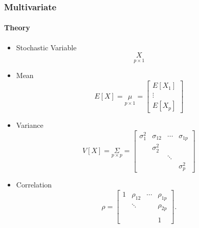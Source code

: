 \documentclass[aspectratio=169,10pt,t]{beamer}
\begin{document}
\begin{frame}[t]
    \frametitle{Multivariate}
    \framesubtitle{Theory}
    \begin{itemize}
        \item<only@1> Stochastic Variable
            \[
                \underset{p\times 1}{X}
            \] 
        \item Mean
            \[
                E \left[ X \right] =
                \underset{p\times 1}{\mu} =
                \begin{bmatrix}
                    E \left[ X_1  \right] \\
                    \vdots\\
                    E \left[ X_p  \right] 
                \end{bmatrix}
            \] 
        \item Variance
            \[
                V \left[ X  \right]  =
                \underset{p\times p}{\Sigma}
                =
                \begin{bmatrix}
                    \sigma_1^{2} & \sigma_{12} & \cdots & \sigma_{1p}\\
                                 & \sigma_2^{2} & &\\
                                 & & \ddots &\\
                                 &&& \sigma_{p}^{2}
                \end{bmatrix}
            \] 
					\item<2> Correlation
						\[
						\rho = \begin{bmatrix}
							1 & \rho_{12} & \cdots & \rho_{1p}\\
								& \ddots& & \rho_{2p}\\
								&&&\\
								& & &1
						\end{bmatrix}
						.\] 
    \end{itemize}
\end{frame}
\end{document}
